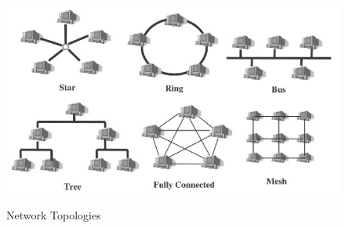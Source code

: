 \begin{figure}[H]
      \caption{Network Topologies \cite{Lewis2004}}
      \centering
      \includegraphics[scale=0.7]{Chapters/Figures/network_topologies.png}
      \label{fig:network_topologies}
\end{figure}


